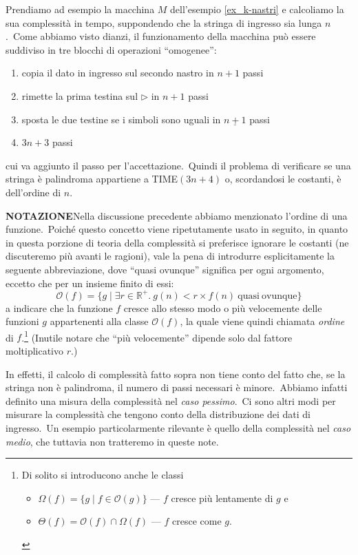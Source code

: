 Prendiamo ad esempio la macchina $M$ dell'esempio \ref{ex_k-nastri} e calcoliamo la sua complessità in tempo, suppondendo che la stringa di ingresso sia lunga $n$.\
Come abbiamo visto dianzi, il funzionamento della macchina può essere suddiviso in tre blocchi di operazioni ``omogenee'':
\begin{enumerate}
    \itemsep0px
    \item copia il dato in ingresso sul secondo nastro in \hfill $n+1$ passi
    \item rimette la prima testina sul $\triangleright$ in \hfill $n+1$ passi
    \item sposta le due testine se i simboli sono uguali in \hfill $\underline{n+1}$ passi
    \item[]\hfill $3n + 3$ passi
\end{enumerate}
cui va aggiunto il passo per l'accettazione.\
Quindi il problema di verificare se una stringa è palindroma appartiene a TIME$(3n + 4)$ o, scordandosi le costanti, è dell'ordine di $n$.\

\medskip
\noindent \textbf{NOTAZIONE}\quad Nella discussione precedente abbiamo menzionato l'ordine di una funzione.\
Poiché questo concetto viene ripetutamente usato in seguito, in quanto in questa porzione di teoria della complessità si preferisce ignorare le costanti (ne discuteremo più avanti le ragioni), vale la pena di introdurre esplicitamente la seguente abbreviazione, dove ``quasi ovunque'' significa per ogni argomento, eccetto che per un insieme finito di essi:
\[\mathcal{O}(f) = \{g \mid \exists r \in \mathbb{R}^+.\ g(n) < r \times f (n)\ \mathrm{quasi\ ovunque}\}\]
a indicare che la funzione $f$ cresce allo stesso modo o più velocemente delle funzioni $g$ appartenenti alla classe $\mathcal{O}(f)$, la quale viene quindi chiamata \textit{ordine} di $f$.\footnote{Di solito si introducono anche le classi
    \begin{itemize}
        \itemsep0px
        \item[] $\Omega(f) = \{g \mid f \in \mathcal{O}(g)\}$ --- $f$ cresce più lentamente di $g$ e
        \item[] $\Theta(f) = \mathcal{O}(f) \cap \Omega(f)$ --- $f$ cresce come $g$.
    \end{itemize}}
(Inutile notare che ``più velocemente'' dipende solo dal fattore moltiplicativo $r$.)\

\medskip

\noindent In effetti, il calcolo di complessità fatto sopra non tiene conto del fatto che, se la stringa non è palindroma, il numero di passi necessari è minore.\
Abbiamo infatti definito una misura della complessità nel \textit{caso pessimo}.\
Ci sono altri modi per misurare la complessità che tengono conto della distribuzione dei dati di ingresso.\
Un esempio particolarmente rilevante è quello della complessità nel \textit{caso medio}, che tuttavia non tratteremo in queste note.

